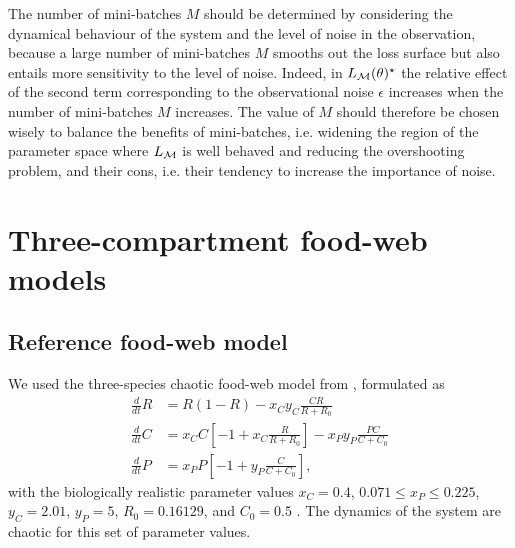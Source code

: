 The number of mini-batches $M$ should be determined by considering the dynamical behaviour of the system and the level of noise in the observation, because a large number of mini-batches $M$ smooths out the loss surface but also entails more sensitivity to the level of noise. Indeed, in $L_{\mathcal{M}}(\theta)^\star$ the relative effect of the second term corresponding to the observational noise $\epsilon$ increases when the number of mini-batches $M$ increases.
%
The value of $M$ should therefore be chosen wisely to balance the benefits of mini-batches, i.e. widening the region of the parameter space where $L_{\mathcal{M}}$ is well behaved and reducing the overshooting problem, and their cons, i.e. their tendency to increase the importance of noise. 

\section{Three-compartment food-web models}
\label{secSI:models}
\subsection{Reference food-web model}
We used the three-species chaotic food-web model from \cite{Hastings1991}, formulated as
\begin{equation}
    \begin{aligned}
        \tfrac{d}{dt} R &= R ( 1 - R ) - x_C y_C \frac{CR}{R + R_0}\\
        \tfrac{d}{dt} C &= x_C C \left[ -1 + x_C \frac{R}{R + R_0} \right] - x_P y_P \frac{PC}{C + C_0}\\
        \tfrac{d}{dt} P &= x_P P \left[ -1 + y_P \frac{C}{C+C_0} \right],
    \end{aligned}
\end{equation}
with the biologically realistic parameter values $x_C = 0.4$, $0.071 \leq x_P \leq 0.225 $, $y_C = 2.01$, $y_P = 5$, $R_0 = 0.16129$, and $C_0 = 0.5$ \cite{McCann1994}. The dynamics of the system are chaotic for this set of parameter values.

